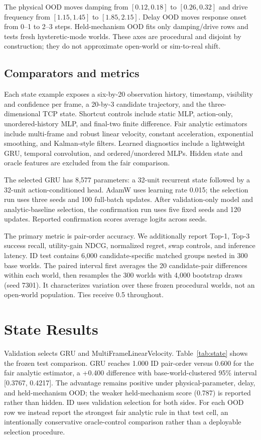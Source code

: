 \documentclass[letterpaper,10pt,conference]{ieeeconf}
\begin{document}
The physical OOD moves damping from $[0.12,0.18]$ to $[0.26,0.32]$ and drive
frequency from $[1.15,1.45]$ to $[1.85,2.15]$. Delay OOD moves response onset
from 0--1 to 2--3 steps. Held-mechanism OOD fits only damping/drive rows and
tests fresh hysteretic-mode worlds. These axes are procedural and disjoint by
construction; they do not approximate open-world or sim-to-real shift.

\subsection{Comparators and metrics}

Each state example exposes a six-by-20 observation history, timestamp,
visibility and confidence per frame, a 20-by-3 candidate trajectory, and the
three-dimensional TCP state. Shortcut controls include static MLP,
action-only, unordered-history MLP, and final-two finite difference. Fair
analytic estimators include
multi-frame and robust linear velocity, constant acceleration, exponential
smoothing, and Kalman-style filters. Learned diagnostics include a lightweight
GRU, temporal convolution, and ordered/unordered MLPs. Hidden state and oracle
features are excluded from the fair comparison.

The selected GRU has 8,577 parameters: a 32-unit recurrent state followed by a
32-unit action-conditioned head. AdamW uses learning rate 0.015; the selection
run uses three seeds and 100 full-batch updates. After validation-only model
and analytic-baseline selection, the confirmation run uses five fixed seeds
and 120 updates. Reported confirmation scores average logits across seeds.

The primary metric is pair-order accuracy. We additionally report Top-1,
Top-3 success recall, utility-gain NDCG, normalized regret, swap controls, and
inference latency. ID test contains 6,000 candidate-specific matched groups
nested in 300 base worlds. The paired interval first averages the 20
candidate-pair differences within each world, then resamples the 300 worlds
with 4,000 bootstrap draws (seed 7301). It characterizes variation over these
frozen procedural worlds, not an open-world population. Ties receive 0.5
throughout.

\section{State Results}

Validation selects GRU and MultiFrameLinearVelocity. Table~\ref{tab:state}
shows the frozen test comparison. GRU reaches 1.000 ID pair-order versus 0.600
for the fair analytic estimator, a +0.400 difference with base-world-clustered
95\% interval [0.3767, 0.4217]. The advantage remains positive under physical-parameter,
delay, and held-mechanism OOD; the weaker held-mechanism score (0.787) is
reported rather than hidden. ID uses validation selection for both sides. For
each OOD row we instead report the strongest fair analytic rule in that test
cell, an intentionally conservative oracle-control comparison rather than a
deployable selection procedure.
\end{document}
